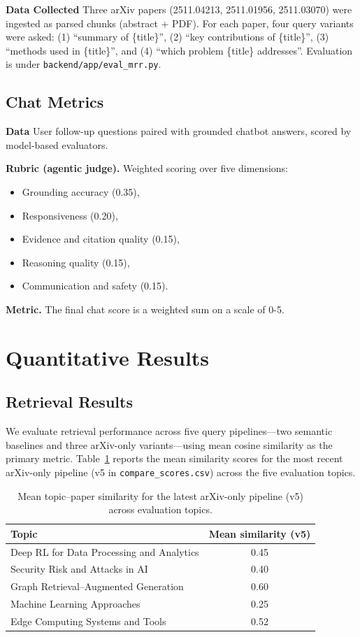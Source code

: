 \documentclass{article}
\begin{document}
\textbf{Data Collected} Three arXiv papers (2511.04213, 2511.01956, 2511.03070) were ingested as parsed chunks (abstract + PDF). For each paper, four query variants were asked: (1) ``summary of \{title\}'', (2) ``key contributions of \{title\}'', (3) ``methods used in \{title\}'', and (4) ``which problem \{title\} addresses''. Evaluation is under \texttt{backend/app/eval\_mrr.py}.

\subsection{Chat Metrics}

\textbf{Data} User follow-up questions paired with grounded chatbot answers, scored by model-based evaluators.

\textbf{Rubric (agentic judge).} Weighted scoring over five dimensions:
\begin{itemize}
  \item Grounding accuracy (0.35),
  \item Responsiveness (0.20),
  \item Evidence and citation quality (0.15),
  \item Reasoning quality (0.15),
  \item Communication and safety (0.15).
\end{itemize}

\textbf{Metric.} The final chat score is a weighted sum on a scale of 0-5.



\section{Quantitative Results}
\subsection{Retrieval Results}

We evaluate retrieval performance across five query pipelines—two semantic baselines and three arXiv-only variants—using mean cosine similarity as the primary metric. Table~\ref{tab:retrieval} reports the mean similarity scores for the most recent arXiv-only pipeline (v5 in \texttt{compare\_scores.csv}) across the five evaluation topics.

\begin{table}[h]
\centering
\begin{tabular}{l|c}
\textbf{Topic} & \textbf{Mean similarity (v5)} \\\hline
Deep RL for Data Processing and Analytics & 0.45 \\
Security Risk and Attacks in AI           & 0.40 \\
Graph Retrieval--Augmented Generation     & 0.60 \\
Machine Learning Approaches               & 0.25 \\
Edge Computing Systems and Tools          & 0.52 \\
\end{tabular}
\caption{\label{tab:retrieval}Mean topic--paper similarity for the latest arXiv-only pipeline (v5) across evaluation topics.}
\end{table}
\end{document}
